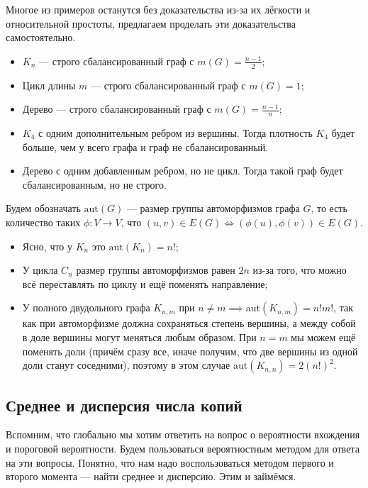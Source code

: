 \begin{example}
  Многое из примеров останутся без доказательства из-за их лёгкости и 
  относительной простоты, предлагаем проделать эти доказательства 
  самостоятельно.
  \begin{itemize}
    \item $K_n$ --- строго сбалансированный граф с $m(G) = \frac{n - 1}{2}$;
    \item Цикл длины $m$ --- строго сбалансированный граф с $m(G) = 1$;
    \item Дерево --- строго сбалансированный граф с $m(G) = \frac{n - 1}{n}$;
    \item $K_4$ с одним дополнительным ребром из вершины. Тогда плотность $K_4$
    будет больше, чем у всего графа и граф не сбалансированный.
    \item Дерево с одним добавленным ребром, но не цикл. Тогда такой граф будет
    сбалансированным, но не строго.
  \end{itemize}
\end{example}

\begin{definition}
  Будем обозначать $\mathrm{aut}(G)$ --- размер группы автоморфизмов графа $G$,
  то есть количество таких $\phi: V \to V$, что $(u, v) \in E(G) \iff (\phi(u), \phi(v)) \in E(G)$.
\end{definition}

\begin{itemize}
  \item Ясно, что у $K_n$ это $\mathrm{aut}(K_n) = n!$;
  \item У цикла $C_n$ размер группы автоморфизмов равен $2n$ из-за того, что можно
  всё переставлять по циклу и ещё поменять направление;
  \item У полного двудольного графа $K_{n, m}$ при $n \neq m \implies \mathrm{aut}(K_{n, m}) =
  n!m!$, так как при автоморфизме должна сохраняться степень вершины, а между
  собой в доле вершины могут меняться любым образом. При $n = m$ мы можем ещё поменять
  доли (причём сразу все, иначе получим, что две вершины из одной доли станут соседними),
  поэтому в этом случае $\mathrm{aut}(K_{n, n}) = 2(n!)^2$.
\end{itemize}

\subsection{Среднее и дисперсия числа копий}

Вспомним, что глобально мы хотим ответить на вопрос о вероятности вхождения и пороговой
вероятности. Будем пользоваться вероятностным методом для ответа на эти вопросы.
Понятно, что нам надо воспользоваться методом первого и второго момента --- найти
среднее и дисперсию. Этим и займёмся.

